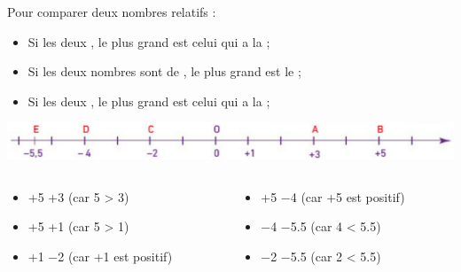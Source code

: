 \documentclass[xcolor={dvipsnames}]{beamer}
\begin{document}
\begin{frame}
	\begin{myprops}
		Pour comparer deux nombres relatifs :
		\begin{itemize}
			\item Si les deux , le \pause plus grand est celui qui a \pause la ;\pause 
			\item Si les deux nombres sont de , \pause le plus grand est \pause le ;
			\item Si les deux , \pause le plus grand est celui qui a \pause la ;
			
		\end{itemize}
	\end{myprops}


	\begin{myexs}
		\begin{center}
			\includegraphics[scale=0.3]{droite2}		
		\end{center}
		

		
			\begin{columns}
				\begin{column}{0.5\textwidth}
					\begin{itemize}
						\item +5 \hspace*{0.5cm} +3 \pause (car 5 > 3) \pause 
						\item +5 \hspace*{0.5cm} +1 \pause  (car 5 > 1) \pause 
						\item +1 \hspace*{0.5cm} \num{-2} \pause (car +1 est positif) \pause 
					\end{itemize}
				\end{column}
			
				\begin{column}{0.5\textwidth}
					\begin{itemize}
						\item +5 \hspace*{0.5cm} \num{-4} \pause  (car +5 est positif) \pause 
						\item \num{-4} \hspace*{0.5cm} \num{-5.5} \pause  (car 4 < \num{5.5}) \pause 
						\item \num{-2} \hspace*{0.5cm} \num{-5.5} \pause  (car 2 < \num{5.5})
					\end{itemize}					
				\end{column}
				
			\end{columns}
		

	\end{myexs}

\end{frame}
\end{document}
